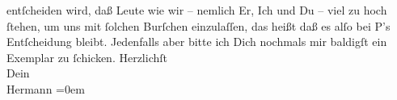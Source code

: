 \begin{ledgroupsized}[t]{13cm}
               entſcheiden wird, daß Leute wie wir – nemlich {\pb}Er,
               Ich und Du – viel zu hoch ſtehen, um uns mit ſolchen Burſchen einzulaſſen, das heißt
               daß es alſo bei P’s Entſcheidung bleibt.\pend
           \pstart
           Jedenfalls aber bitte ich Dich nochmals mir baldigſt ein Exemplar zu ſchicken.\pend
           \pstart
           Herzlichſt{\\[\baselineskip]}Dein{\\[\baselineskip]}\spacefill\mbox{Hermann}\pend
           \leftskip=0em{}
         
         \endnumbering{}\end{ledgroupsized}  \newcommand{\dateiname}{L01283}\newcommand{\titel}{Hermann Bahr an Arthur Schnitzler, [30. 3. 1903]}\newcommand{\editorInnen}{ Kurt Ifkovits,  Martin Anton Müller}
      
